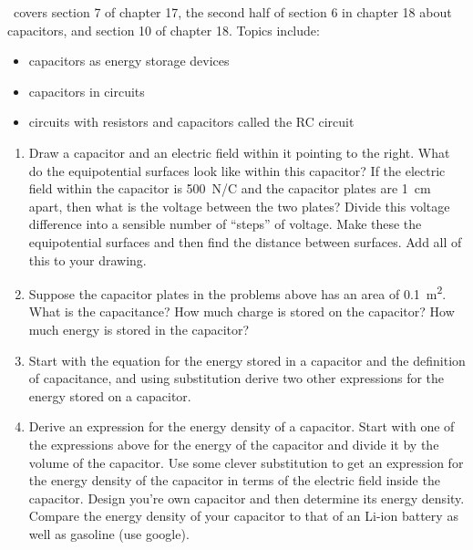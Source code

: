 \week \ covers section 7 of chapter 17, the second half of section 6 in chapter 18 about capacitors, and section 10 of chapter 18. Topics include:

\begin{itemize}
	\item capacitors as energy storage devices
	\item capacitors in circuits
	\item circuits with resistors and capacitors called the RC circuit
\end{itemize}

\begin{enumerate}
\setlength\itemsep{2 in}

\item
Draw a capacitor and an electric field within it pointing to the right. What do the equipotential surfaces look like within this capacitor? If the electric field within the capacitor is \SI{500}{N/C} and the capacitor plates are \SI{1}{cm} apart, then what is the voltage between the two plates? Divide this voltage difference into a sensible number of ``steps'' of voltage. Make these the equipotential surfaces and then find the distance between surfaces. Add all of this to your drawing.\hugeskip


\item
Suppose the capacitor plates in the problems above has an area of \SI{0.1}{m^2}. What is the capacitance? How much charge is stored on the capacitor? How much energy is stored in the capacitor?

\item
Start with the equation for the energy stored in a capacitor and the definition of capacitance, and using substitution derive two other expressions for the energy stored on a capacitor.

\item
Derive an expression for the energy density of a capacitor. Start with one of the expressions above for the energy of the capacitor and divide it by the volume of the capacitor. Use some clever substitution to get an expression for the energy density of the capacitor in terms of the electric field inside the capacitor. Design you're own capacitor and then determine its energy density. Compare the energy density of your capacitor to that of an Li-ion battery as well as gasoline (use google). 


\end{enumerate}
